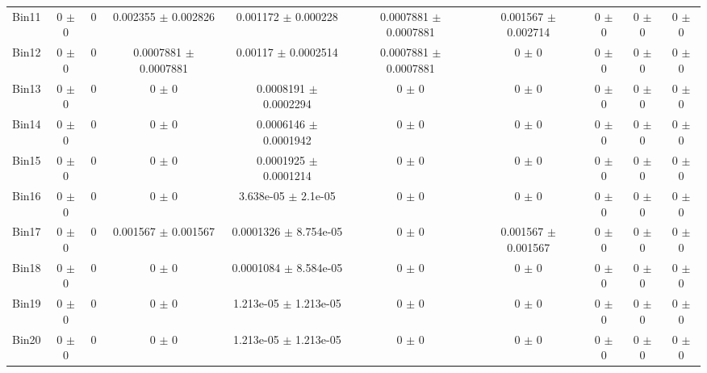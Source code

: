 \begin{tabular}{@{\extracolsep{4pt}}lccccccccc@{}}
     Bin11 & 0 $\pm$ 0 & 0 & 0.002355 $\pm$ 0.002826 & 0.001172 $\pm$ 0.000228 & 0.0007881 $\pm$ 0.0007881 & 0.001567 $\pm$ 0.002714 & 0 $\pm$ 0 & 0 $\pm$ 0 & 0 $\pm$ 0 \\ 
     Bin12 & 0 $\pm$ 0 & 0 & 0.0007881 $\pm$ 0.0007881 & 0.00117 $\pm$ 0.0002514 & 0.0007881 $\pm$ 0.0007881 & 0 $\pm$ 0 & 0 $\pm$ 0 & 0 $\pm$ 0 & 0 $\pm$ 0 \\ 
     Bin13 & 0 $\pm$ 0 & 0 & 0 $\pm$ 0 & 0.0008191 $\pm$ 0.0002294 & 0 $\pm$ 0 & 0 $\pm$ 0 & 0 $\pm$ 0 & 0 $\pm$ 0 & 0 $\pm$ 0 \\ 
     Bin14 & 0 $\pm$ 0 & 0 & 0 $\pm$ 0 & 0.0006146 $\pm$ 0.0001942 & 0 $\pm$ 0 & 0 $\pm$ 0 & 0 $\pm$ 0 & 0 $\pm$ 0 & 0 $\pm$ 0 \\ 
     Bin15 & 0 $\pm$ 0 & 0 & 0 $\pm$ 0 & 0.0001925 $\pm$ 0.0001214 & 0 $\pm$ 0 & 0 $\pm$ 0 & 0 $\pm$ 0 & 0 $\pm$ 0 & 0 $\pm$ 0 \\ 
     Bin16 & 0 $\pm$ 0 & 0 & 0 $\pm$ 0 & 3.638e-05 $\pm$ 2.1e-05 & 0 $\pm$ 0 & 0 $\pm$ 0 & 0 $\pm$ 0 & 0 $\pm$ 0 & 0 $\pm$ 0 \\ 
     Bin17 & 0 $\pm$ 0 & 0 & 0.001567 $\pm$ 0.001567 & 0.0001326 $\pm$ 8.754e-05 & 0 $\pm$ 0 & 0.001567 $\pm$ 0.001567 & 0 $\pm$ 0 & 0 $\pm$ 0 & 0 $\pm$ 0 \\ 
     Bin18 & 0 $\pm$ 0 & 0 & 0 $\pm$ 0 & 0.0001084 $\pm$ 8.584e-05 & 0 $\pm$ 0 & 0 $\pm$ 0 & 0 $\pm$ 0 & 0 $\pm$ 0 & 0 $\pm$ 0 \\ 
     Bin19 & 0 $\pm$ 0 & 0 & 0 $\pm$ 0 & 1.213e-05 $\pm$ 1.213e-05 & 0 $\pm$ 0 & 0 $\pm$ 0 & 0 $\pm$ 0 & 0 $\pm$ 0 & 0 $\pm$ 0 \\ 
     Bin20 & 0 $\pm$ 0 & 0 & 0 $\pm$ 0 & 1.213e-05 $\pm$ 1.213e-05 & 0 $\pm$ 0 & 0 $\pm$ 0 & 0 $\pm$ 0 & 0 $\pm$ 0 & 0 $\pm$ 0 \\ 
\hline\hline
  \end{tabular}
